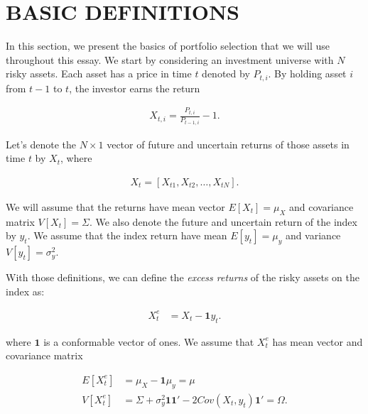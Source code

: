 \documentclass[12pt,oneside,a4paper]{memoir}
\begin{document}
\section{BASIC DEFINITIONS} \label{sec:defs}

In this section, we present the basics of portfolio selection that we will use throughout this essay.
We start by considering an investment universe with $N$ risky assets.
Each asset has a price in time $t$ denoted by $P_{t,i}$.
By holding asset $i$ from $t-1$ to $t$, the investor earns the return

\vspace{-18 pt}
\begin{align} \label{eq:ret}
	X_{t,i} = \frac{P_{t,i}}{P_{t-1,i}} - 1.
\end{align}

Let's  denote the $N\times1$ vector of future and uncertain returns of those assets in time $t$ by $X_{t}$, where 

\vspace{-18 pt}
\begin{align*} %
	X_{t} =  [X_{t1}, X_{t2} , \dots, X_{tN}].
\end{align*}

\noindent
We will assume that the returns have mean vector $E[X_{t}] =\mu_{X}$ and covariance matrix $V[X_{t}] =\Sigma$.
We also denote the future and uncertain return of the index by $y_{t}$.
We assume that the index return have mean $E[y_{t}] = \mu_{y}$ and variance $V[y_{t}]=\sigma^2_{y}$.


With those definitions, we can define the \textit{excess returns} of the risky assets on the index as:

\vspace{-18 pt}
\begin{align*}
	X^{e}_{t} &= X_{t} - \mathbf{1} y_{t}.
\end{align*}

\noindent
where $\mathbf{1}$ is a conformable vector of ones.
We assume that $X^{e}_{t}$ has mean vector and covariance matrix 

\vspace{-18 pt}
\begin{align*}
E[X^{e}_{t}] &= \mu_{X} - \mathbf{1} \mu_{y}=\mu
\\
V[X^{e}_{t}] &=
\Sigma +
\sigma_{y}^{2} \mathbf{1}\mathbf{1}' -
2Cov(X_{t},y_{t})\mathbf{1}' =\Omega.
\end{align*}
\end{document}
